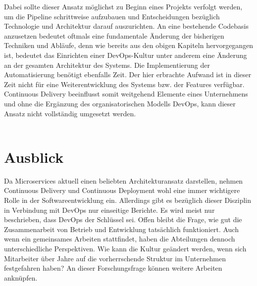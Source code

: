 Dabei sollte dieser Ansatz möglichst zu Beginn eines Projekts verfolgt werden, um die Pipeline schrittweise aufzubauen und Entscheidungen bezüglich Technologie und Architektur darauf auszurichten. An eine bestehende Codebasis anzusetzen bedeutet oftmals eine fundamentale Änderung der bisherigen Techniken und Abläufe, denn wie bereits aus den obigen Kapiteln hervorgegangen ist, bedeutet das Einrichten einer DevOps-Kultur unter anderem eine Änderung an der gesamten Architektur des Systems. Die Implementierung der Automatisierung benötigt ebenfalls Zeit. Der hier erbrachte Aufwand ist in dieser Zeit nicht für eine Weiterentwicklung des Systems bzw. der Features verfügbar. Continuous Delivery beeinflusst somit weitgehend Elemente eines Unternehmens und ohne die Ergänzung des organisatorischen Modells DevOps, kann dieser Ansatz nicht vollständig umgesetzt werden.\\ \\

\section{Ausblick}
Da Microservices aktuell einen beliebten Architekturansatz darstellen, nehmen Continuous Delivery und Continuous Deployment wohl eine immer wichtigere Rolle in der Softwareentwicklung ein. Allerdings gibt es bezüglich dieser Disziplin in Verbindung mit DevOps nur einseitige Berichte. Es wird meist nur beschrieben, dass DevOps der Schlüssel sei. Offen bleibt die Frage, wie gut die Zusammenarbeit von Betrieb und Entwicklung tatsächlich funktioniert. Auch wenn ein gemeinsames Arbeiten stattfindet, haben die Abteilungen dennoch unterschiedliche Perspektiven. Wie kann die Kultur geändert werden, wenn sich Mitarbeiter über Jahre auf die vorherrschende Struktur im Unternehmen festgefahren haben? An dieser Forschungsfrage können weitere Arbeiten anknüpfen. 


\ifCLASSOPTIONcaptionsoff
  \newpage
\fi